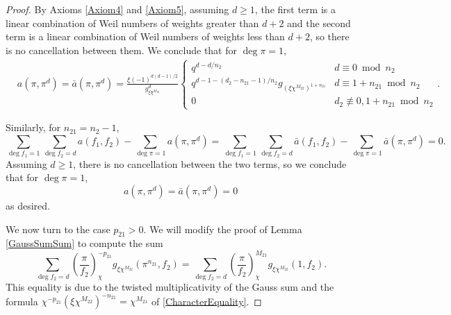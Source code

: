 \documentclass[11pt,letterpaper]{article}
\theoremstyle{definition}
\theoremstyle{remark}
\numberwithin{equation}{section}
\theoremstyle{dotless}
\newcommand{\res}[2]{\left(\frac{#1}{#2}\right)}
\begin{document}
\begin{proof}
By Axioms \ref{Axiom4} and \ref{Axiom5}, assuming $d\geq 1$, the first term is a linear combination of Weil numbers of weights greater than $d+2$ and the second term is a linear combination of Weil numbers of weights less than $d+2$, so there is no cancellation between them.  We conclude that for $\deg \pi =1$, 
\begin{equation*}
\begin{split}
&a(\pi, \pi^{d})  = \bar{a}(\pi, \pi^{d}) = \frac{\xi(-1)^{d(d-1)/2}}{g_{\xi \chi^{M_{22}}}^{d}} \left\lbrace \begin{array}{cc} 
q^{d-d/n_2} & d \equiv 0 \bmod n_2 \\
q^{d-1-(d_2-n_{21}-1)/n_2}g_{(\xi \chi^{M_{22}})^{1+n_{21}}} & d \equiv 1+n_{21} \bmod n_2 \\
0 & d_2 \not \equiv 0, 1+n_{21} \bmod n_2
\end{array} \right. .
\end{split}
\end{equation*}

Similarly, for $n_{21}=n_2-1$, 
\begin{equation*}
\sum_{\deg f_1 = 1} \sum_{\deg f_2 = d} a(f_1, f_2) - \sum_{\deg \pi = 1} a(\pi, \pi^{d})  =\sum_{\deg f_1 = 1} \sum_{\deg f_2 = d} \bar{a}(f_1, f_2) - \sum_{\deg \pi = 1} \bar{a}(\pi, \pi^{d})  =0.
\end{equation*}
Assuming $d \geq 1$, there is no cancellation between the two terms, so we conclude that for $\deg \pi=1$,
\begin{equation*}
a(\pi, \pi^{d})=\bar{a}(\pi, \pi^{d})=0
\end{equation*}
as desired.

We now turn to the case $p_{21}>0$. We will modify the proof of Lemma \ref{GaussSumSum} to compute the sum 
\begin{equation*} 
\sum_{\deg f_2=d} \res{\pi}{f_2}_{\chi}^{-p_{21}} g_{\xi \chi^{M_{22}}}(\pi^{n_{21}}, f_2) = \sum_{\deg f_2=d} \res{\pi}{f_2}_{\chi}^{M_{21}} g_{\xi \chi^{M_{22}}}(1, f_2).
\end{equation*}
This equality is due to the twisted multiplicativity of the Gauss sum and the formula $\chi^{-p_{21}}(\xi \chi^{M_{22}})^{-n_{21}} = \chi^{M_{21}}$ of \eqref{CharacterEquality}.


\end{proof}
\end{document}
